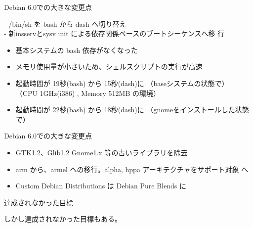 \begin{frame}{Debian 6.0での大きな変更点}

\large - /bin/sh を bash から dash へ切り替え\\
\large - 新insservとsysv init による依存関係ベースのブートシーケンスへ移
 行

\begin{itemize}
\item 基本システムの bash 依存がなくなった
\item メモリ使用量が小さいため、シェルスクリプトの実行が高速
\item 起動時間が 19秒(bash) から 15秒(dash)に （baseシステムの状態で）\\
（CPU 1GHz(i386) , Memory 512MB の環境）
\item 起動時間が 22秒(bash) から 18秒(dash)に （gnomeをインストールした状態で）
\end{itemize}
\end{frame}

\begin{frame}{Debian 6.0での大きな変更点}
\begin{itemize}%
\item GTK1.2、Glib1.2 Gnome1.x 等の古いライブラリを除去
\item arm から、armel への移行。alpha, hppa アーキテクチャをサポート対象
      へ
\item Custom Debian Distributions は Debian Pure Blends に
\end{itemize}

\end{frame}


\begin{frame}{達成されなかった目標}
\begin{center}
しかし達成されなかった目標もある。
\end{center}
\end{frame}



